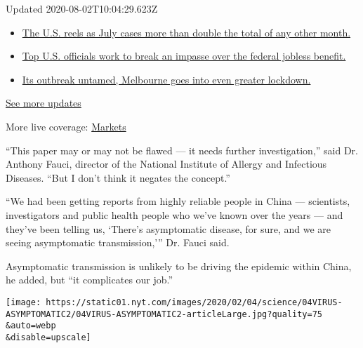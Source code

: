 Updated 2020-08-02T10:04:29.623Z

\begin{itemize}
\tightlist
\item
  \href{https://www.nytimes.com/2020/08/01/world/coronavirus-covid-19.html?action=click\&pgtype=Article\&state=default\&region=MAIN_CONTENT_1\&context=storylines_live_updates\#link-34047410}{The
  U.S. reels as July cases more than double the total of any other
  month.}
\item
  \href{https://www.nytimes.com/2020/08/01/world/coronavirus-covid-19.html?action=click\&pgtype=Article\&state=default\&region=MAIN_CONTENT_1\&context=storylines_live_updates\#link-780ec966}{Top
  U.S. officials work to break an impasse over the federal jobless
  benefit.}
\item
  \href{https://www.nytimes.com/2020/08/01/world/coronavirus-covid-19.html?action=click\&pgtype=Article\&state=default\&region=MAIN_CONTENT_1\&context=storylines_live_updates\#link-2bc8948}{Its
  outbreak untamed, Melbourne goes into even greater lockdown.}
\end{itemize}

\href{https://www.nytimes.com/2020/08/01/world/coronavirus-covid-19.html?action=click\&pgtype=Article\&state=default\&region=MAIN_CONTENT_1\&context=storylines_live_updates}{See
more updates}

More live coverage:
\href{https://www.nytimes.com/live/2020/07/31/business/stock-market-today-coronavirus?action=click\&pgtype=Article\&state=default\&region=MAIN_CONTENT_1\&context=storylines_live_updates}{Markets}

``This paper may or may not be flawed --- it needs further
investigation,'' said Dr. Anthony Fauci, director of the National
Institute of Allergy and Infectious Diseases. ``But I don't think it
negates the concept.''

``We had been getting reports from highly reliable people in China ---
scientists, investigators and public health people who we've known over
the years --- and they've been telling us, `There's asymptomatic
disease, for sure, and we are seeing asymptomatic transmission,''' Dr.
Fauci said.

Asymptomatic transmission is unlikely to be driving the epidemic within
China, he added, but ``it complicates our job.''

\texttt{[image: https://static01.nyt.com/images/2020/02/04/science/04VIRUS-ASYMPTOMATIC2/04VIRUS-ASYMPTOMATIC2-articleLarge.jpg?quality=75\\\&auto=webp\\\&disable=upscale]}

